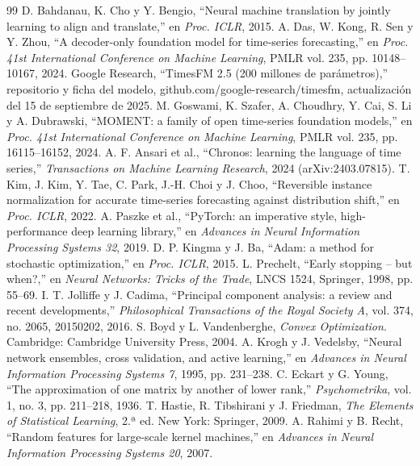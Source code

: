 \documentclass[11pt,a4paper]{article}
\begin{document}
\begin{thebibliography}{99}
 D. Bahdanau, K. Cho y Y. Bengio, ``Neural machine translation by jointly learning to align and translate,'' en \emph{Proc. ICLR}, 2015.
 A. Das, W. Kong, R. Sen y Y. Zhou, ``A decoder-only foundation model for time-series forecasting,'' en \emph{Proc. 41st International Conference on Machine Learning}, PMLR vol. 235, pp. 10148--10167, 2024.
 Google Research, ``TimesFM 2.5 (200 millones de parámetros),'' repositorio y ficha del modelo, github.com/google-research/timesfm, actualización del 15 de septiembre de 2025.
 M. Goswami, K. Szafer, A. Choudhry, Y. Cai, S. Li y A. Dubrawski, ``MOMENT: a family of open time-series foundation models,'' en \emph{Proc. 41st International Conference on Machine Learning}, PMLR vol. 235, pp. 16115--16152, 2024.
 A. F. Ansari et al., ``Chronos: learning the language of time series,'' \emph{Transactions on Machine Learning Research}, 2024 (arXiv:2403.07815).
 T. Kim, J. Kim, Y. Tae, C. Park, J.-H. Choi y J. Choo, ``Reversible instance normalization for accurate time-series forecasting against distribution shift,'' en \emph{Proc. ICLR}, 2022.
 A. Paszke et al., ``PyTorch: an imperative style, high-performance deep learning library,'' en \emph{Advances in Neural Information Processing Systems 32}, 2019.
 D. P. Kingma y J. Ba, ``Adam: a method for stochastic optimization,'' en \emph{Proc. ICLR}, 2015.
 L. Prechelt, ``Early stopping -- but when?,'' en \emph{Neural Networks: Tricks of the Trade}, LNCS 1524, Springer, 1998, pp. 55--69.
 I. T. Jolliffe y J. Cadima, ``Principal component analysis: a review and recent developments,'' \emph{Philosophical Transactions of the Royal Society A}, vol. 374, no. 2065, 20150202, 2016.
 S. Boyd y L. Vandenberghe, \emph{Convex Optimization}. Cambridge: Cambridge University Press, 2004.
 A. Krogh y J. Vedelsby, ``Neural network ensembles, cross validation, and active learning,'' en \emph{Advances in Neural Information Processing Systems 7}, 1995, pp. 231--238.
 C. Eckart y G. Young, ``The approximation of one matrix by another of lower rank,'' \emph{Psychometrika}, vol. 1, no. 3, pp. 211--218, 1936.
 T. Hastie, R. Tibshirani y J. Friedman, \emph{The Elements of Statistical Learning}, 2.ª ed. New York: Springer, 2009.
 A. Rahimi y B. Recht, ``Random features for large-scale kernel machines,'' en \emph{Advances in Neural Information Processing Systems 20}, 2007.

\end{thebibliography}
\end{document}
